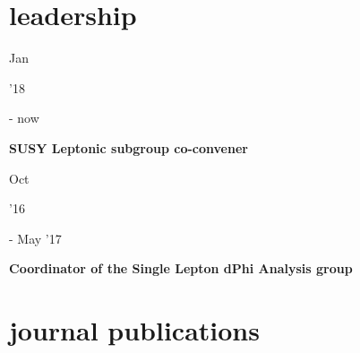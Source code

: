 \documentclass[]{cv} %
\begin{document}
\section{leadership}

\begin{entrylist}

  \entry
  {\parbox[t]{\parboxWidthOne}{Jan}\parbox[t]{\parboxWidthTwo}{\hfill '18} - now}
  {\textbf{SUSY Leptonic subgroup co-convener}}
  {}
  {}

  \entry
  {\parbox[t]{\parboxWidthOne}{Oct}\parbox[t]{\parboxWidthTwo}{\hfill '16} - May '17}
  {\textbf{Coordinator of the Single Lepton dPhi Analysis group}}
  {}
  {}

\end{entrylist}

\newpage

\section{journal publications}
\end{document}
